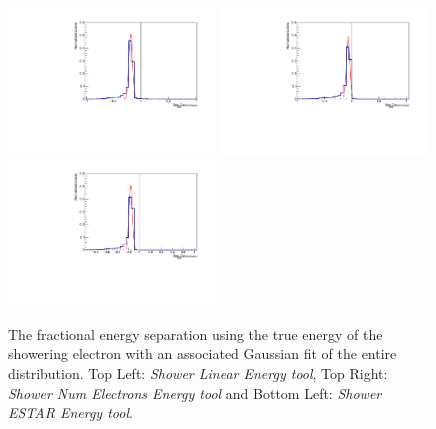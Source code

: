 \begin{figure}[h!]
    \centering
    \includegraphics[width = 0.49\textwidth]{figures-chap4/hist_gauss_fit/linear_showering_e.pdf}
    \includegraphics[width = 0.49\textwidth]{figures-chap4/hist_gauss_fit/oldmethod_showering_e_attempt2.pdf}
    \includegraphics[width = 0.49\textwidth]{figures-chap4/hist_gauss_fit/ESTAR_showering_e_attempt2.pdf}
    \captionsetup{width=0.45\textwidth}
    \parbox[b]{0.49\textwidth}%
  {
    \caption[Fractional energy separation using the true energy of the showering electron with a Gaussian fitted to the distribution.]
    {The fractional energy separation using the true energy of the showering electron with an associated Gaussian fit of the entire distribution. Top Left: \textit{Shower Linear Energy tool}, Top Right: \textit{Shower Num Electrons Energy tool} and Bottom Left: \textit{Shower ESTAR Energy tool}. \\}
    \label{fig:gauss_fit_showering_e}}
\end{figure}

\newpage

